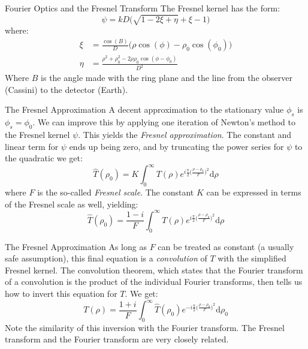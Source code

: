 \documentclass{beamer}
\begin{document}
    \begin{frame}{Fourier Optics and the Fresnel Transform}
        The Fresnel kernel has the form:
        \begin{equation}
            \psi=kD\Big(\sqrt{1-2\xi+\eta}+\xi-1\Big)
        \end{equation}
        where:
        \begin{align}
            \xi&=
            \frac{\cos(B)}{D}\big(\rho\cos(\phi)-\rho_{0}\cos(\phi_{0})\big)\\
            \eta&=
            \frac{\rho^{2}+\rho_{0}^{2}-2\rho\rho_{0}\cos(\phi-\phi_{0})}{D^2}
        \end{align}
        Where $B$ is the angle made with the ring plane and the line from
        the observer (Cassini) to the detector (Earth).
    \end{frame}
    \begin{frame}{The Fresnel Approximation}
        A decent approximation to the stationary value $\phi_{s}$ is
        $\phi_{s}=\phi_{0}$. We can improve this by applying one iteration of
        Newton's method to the Fresnel kernel $\psi$. This yields the
        \textit{Fresnel approximation}. The constant and linear term for
        $\psi$ ends up being zero, and by truncating the power series for
        $\psi$ to the quadratic we get:
        \begin{equation}
            \hat{T}(\rho_{0})=K\int_{0}^{\infty}
                T(\rho)e^{i\frac{\pi}{2}\big(\frac{\rho-\rho_{0}}{F}\big)^{2}}\textrm{d}\rho
        \end{equation}
        where $F$ is the so-called \textit{Fresnel scale}. The constant $K$ can
        be expressed in terms of the Fresnel scale as well, yielding:
        \begin{equation}
            \hat{T}(\rho_{0})=\frac{1-i}{F}\int_{0}^{\infty}
                T(\rho)e^{i\frac{\pi}{2}\big(\frac{\rho-\rho_{0}}{F}\big)^{2}}\textrm{d}\rho
        \end{equation}
    \end{frame}
    \begin{frame}{The Fresnel Approximation}
        As long as $F$ can be treated as constant (a usually safe assumption),
        this final equation is a \textit{convolution} of $T$ with the
        simplified Fresnel kernel. The convolution theorem, which states that
        the Fourier transform of a convolution is the product of the
        individual Fourier transforms, then tells us how to invert this
        equation for $T$. We get:
        \begin{equation}
            T(\rho)=\frac{1+i}{F}\int_{0}^{\infty}
                \hat{T}(\rho_{0})e^{-i\frac{\pi}{2}\big(\frac{\rho-\rho_{0}}{F}\big)^{2}}\textrm{d}\rho_{0}
        \end{equation}
        Note the similarity of this inversion with the Fourier transform.
        The Fresnel transform and the Fourier transform are very closely
        related.
    \end{frame}
\end{document}
